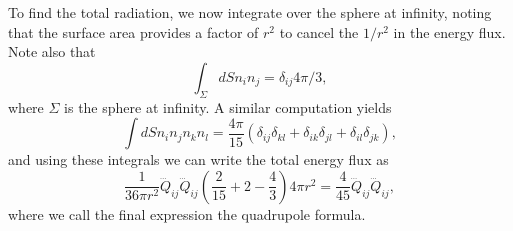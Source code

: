 To find the total radiation, we now integrate over the sphere at infinity, noting that the surface area provides a factor of $r^2$ to cancel the $1/r^2$ in the energy flux. Note also that $$\int_\Sigma dS n_i n_j = \delta_{ij}4\pi/3,$$ where $\Sigma$ is the sphere at infinity. A similar computation yields
$$\int dS n_i n_j n_k n_l = \frac{4\pi}{15}(\delta_{ij}\delta_{kl}+\delta_{ik} \delta_{jl}+\delta_{il}\delta_{jk}),$$
and using these integrals we can write the total energy flux as
$$\frac{1}{36\pi r^2}\dddot Q_{ij} \dddot Q_{ij}\left(\frac{2}{15}+2-\frac{4}{3}\right)4\pi r^2 =\frac{4}{45}\dddot Q_{ij}\dddot Q_{ij},$$
where we call the final expression the quadrupole formula. 

